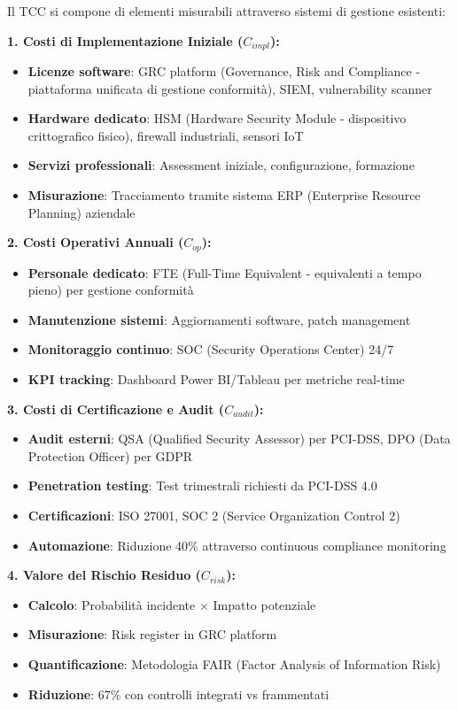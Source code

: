 Il TCC si compone di elementi misurabili attraverso sistemi di gestione esistenti:

\textbf{1. Costi di Implementazione Iniziale ($C_{impl}$):}
\begin{itemize}
    \item \textbf{Licenze software}: GRC platform (Governance, Risk and Compliance - piattaforma unificata di gestione conformità), SIEM, vulnerability scanner
    \item \textbf{Hardware dedicato}: HSM (Hardware Security Module - dispositivo crittografico fisico), firewall industriali, sensori IoT
    \item \textbf{Servizi professionali}: Assessment iniziale, configurazione, formazione
    \item \textbf{Misurazione}: Tracciamento tramite sistema ERP (Enterprise Resource Planning) aziendale
\end{itemize}

\textbf{2. Costi Operativi Annuali ($C_{op}$):}
\begin{itemize}
    \item \textbf{Personale dedicato}: FTE (Full-Time Equivalent - equivalenti a tempo pieno) per gestione conformità
    \item \textbf{Manutenzione sistemi}: Aggiornamenti software, patch management
    \item \textbf{Monitoraggio continuo}: SOC (Security Operations Center) 24/7
    \item \textbf{KPI tracking}: Dashboard Power BI/Tableau per metriche real-time
\end{itemize}

\textbf{3. Costi di Certificazione e Audit ($C_{audit}$):}
\begin{itemize}
    \item \textbf{Audit esterni}: QSA (Qualified Security Assessor) per PCI-DSS, DPO (Data Protection Officer) per GDPR
    \item \textbf{Penetration testing}: Test trimestrali richiesti da PCI-DSS 4.0
    \item \textbf{Certificazioni}: ISO 27001, SOC 2 (Service Organization Control 2)
    \item \textbf{Automazione}: Riduzione 40\% attraverso continuous compliance monitoring
\end{itemize}

\textbf{4. Valore del Rischio Residuo ($C_{risk}$):}
\begin{itemize}
    \item \textbf{Calcolo}: Probabilità incidente × Impatto potenziale
    \item \textbf{Misurazione}: Risk register in GRC platform
    \item \textbf{Quantificazione}: Metodologia FAIR (Factor Analysis of Information Risk)
    \item \textbf{Riduzione}: 67\% con controlli integrati vs frammentati
\end{itemize}

